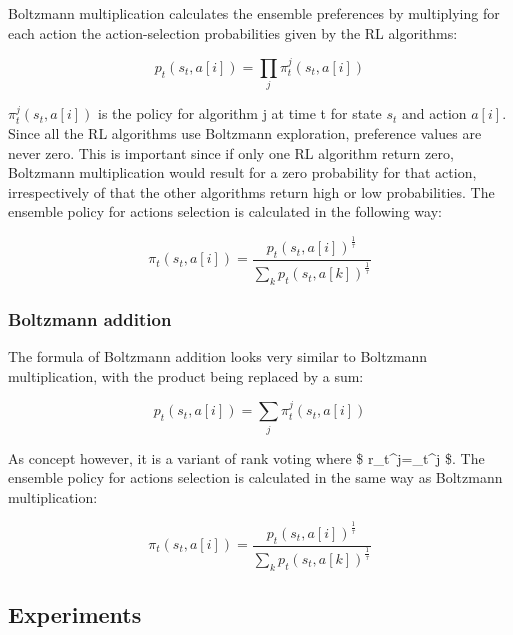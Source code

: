 Boltzmann multiplication calculates the ensemble preferences by
multiplying for each action the action-selection probabilities given by
the RL algorithms:

\[ p_t(s_t, a[i]) = \prod_j \pi_t^j (s_t, a[i]) \]

\(\pi_t^j(s_t, a[i])\) is the policy for algorithm j at time t for state
\(s_t\) and action \(a[i]\). Since all the RL algorithms use Boltzmann
exploration, preference values are never zero. This is important since
if only one RL algorithm return zero, Boltzmann multiplication would
result for a zero probability for that action, irrespectively of that
the other algorithms return high or low probabilities. The ensemble
policy for actions selection is calculated in the following way:

\[ \pi_t (s_t, a[i]) = \frac{ p_t(s_t, a[i])^{\frac{1}{\tau}}}{\sum_k p_t(s_t, a[k])^{\frac{ 1 }{\tau}}} \]

\hypertarget{boltzmann-addition}{%
\subsubsection{Boltzmann addition}\label{boltzmann-addition}}

The formula of Boltzmann addition looks very similar to Boltzmann
multiplication, with the product being replaced by a sum:

\[ p_t(s_t, a[i]) = \sum_j \pi_t^j (s_t, a[i]) \]

As concept however, it is a variant of rank voting where \$
r\_t\^{}j=\pi\_t\^{}j \$. The ensemble policy for actions selection is
calculated in the same way as Boltzmann multiplication:

\[ \pi_t (s_t, a[i]) = \frac{ p_t(s_t, a[i])^{\frac{1}{\tau}}}{\sum_k p_t(s_t, a[k])^{\frac{ 1 }{\tau}}} \]

\hypertarget{experiments}{%
\subsection{Experiments}\label{experiments}}

